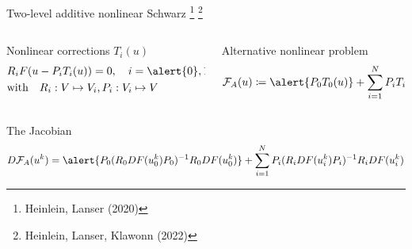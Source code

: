 \begin{frame}{Two-level additive nonlinear Schwarz \footnote{\tiny Heinlein, Lanser (2020)} \footnote{\tiny Heinlein, Lanser, Klawonn (2022)}}
	\begin{columns}
		\begin{column}{0.47\textwidth}
			\begin{block}{\normalsize Nonlinear corrections $T_i(u)$}
				\vspace*{-4mm}
				\begin{align*}
					 & R_iF(u-P_iT_i(u))  = 0, \quad i = \alert{0},1,\dots,N      \\
					 & \text{with}\quad R_i:V\mapsto V_i\text{,}\, P_i:V_i\mapsto V
				\end{align*}
			\end{block}
		\end{column}
        \hspace{-3mm}
		\begin{column}{0.47\textwidth}
			\begin{block}{\normalsize Alternative nonlinear problem}
				\vspace*{-4mm}
				\begin{equation*}
					\mathcal{F}_A(u) \coloneqq \alert{P_0T_0(u)} + \sum_{i=1}^NP_iT_i(u) = 0
				\end{equation*}
			\end{block}
		\end{column}
	\end{columns}
	\begin{block}{\normalsize The Jacobian}
		\vspace*{-2mm}
		\begin{align*}
			D\mathcal{F}_A(u^k)  = \alert{P_0(R_0DF(u_0^k)P_0)^{-1}R_0DF(u_0^k)} + \sum_{i=1}^NP_i(R_iDF(u_i^k)P_i)^{-1}R_iDF(u_i^k)
		\end{align*}
	\end{block}
\end{frame}

